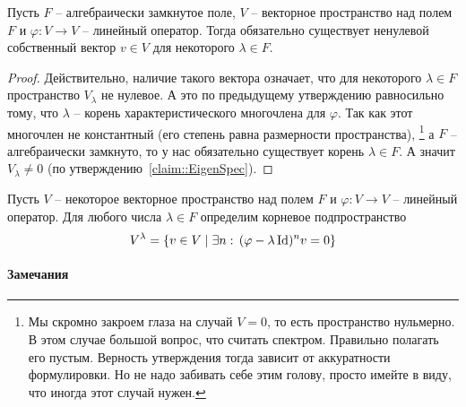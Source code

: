 \begin{claim}
Пусть $F$ -- алгебраически замкнутое поле, $V$ -- векторное пространство над полем $F$ и $\varphi\colon V\to V$ -- линейный оператор.
Тогда обязательно существует ненулевой собственный вектор $v\in V$ для некоторого $\lambda\in F$.
\end{claim}
\begin{proof}
Действительно, наличие такого вектора означает, что для некоторого $\lambda\in F$ пространство $V_\lambda$ не нулевое.
А это по предыдущему утверждению равносильно тому, что $\lambda$ -- корень характеристического многочлена для $\varphi$.
Так как этот многочлен не константный (его степень равна размерности пространства),%
\footnote{Мы скромно закроем глаза на случай $V = 0$, то есть пространство нульмерно.
В этом случае большой вопрос, что считать спектром.
Правильно полагать его пустым.
Верность утверждения тогда зависит от аккуратности формулировки.
Но не надо забивать себе этим голову, просто имейте в виду, что иногда этот случай нужен.}
а $F$ -- алгебраически замкнуто, то у нас обязательно существует корень $\lambda\in F$.
А значит $V_\lambda \neq 0$ (по утверждению~\ref{claim::EigenSpec}).
\end{proof}

\begin{definition}
Пусть $V$ -- некоторое векторное пространство над полем $F$ и $\varphi \colon V\to V$ -- линейный оператор.
Для любого числа $\lambda \in F$ определим корневое подпространство
\[
V^\lambda = \{v\in V\mid \exists n:\,(\varphi - \lambda\operatorname{Id})^n v = 0\}
\]
\end{definition}

\paragraph{Замечания}


